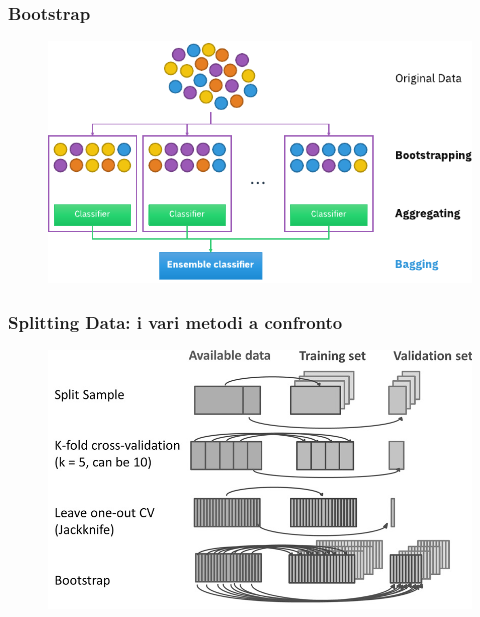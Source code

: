 \begin{frame}

	\frametitle{Bootstrap}
	\begin{figure}[!htbp]
		\centering
		\includegraphics[width=0.9\linewidth]{images/supervised/validation_test_splitting_data/Ensemble_Bagging.pdf}
	\end{figure}

\end{frame}

\begin{frame}

	\frametitle{Splitting Data: i vari metodi a confronto}
	\begin{figure}[!htbp]
		\centering
		\includegraphics[width=0.9\linewidth]{images/supervised/validation_test_splitting_data/resampling_methods.png}
	\end{figure}

\end{frame}
